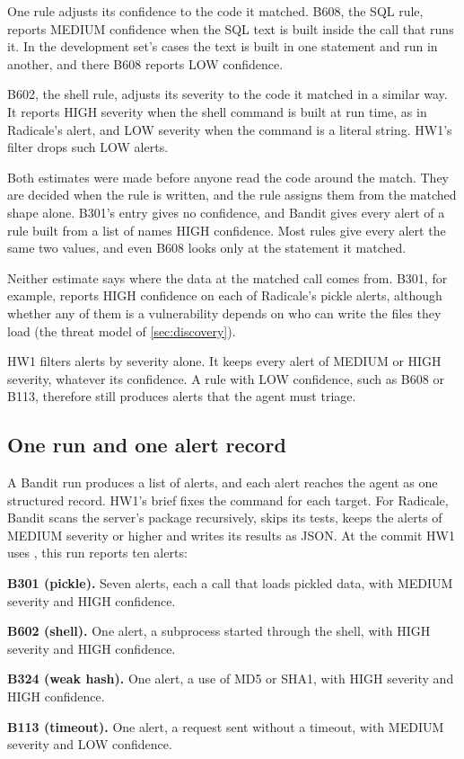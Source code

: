 One rule adjusts its confidence to the code it matched. B608, the SQL rule, reports MEDIUM
confidence when the SQL text is built inside the call that runs it. In the development set's cases
the text is built in one statement and run in another, and there B608 reports LOW confidence.

B602, the shell rule, adjusts its severity to the code it matched in a similar way. It reports HIGH
severity when the shell command is built at run time, as in Radicale's alert, and LOW severity when
the command is a literal string. HW1's filter drops such LOW alerts.

Both estimates were made before anyone read the code around the match. They are decided when the
rule is written, and the rule assigns them from the matched shape alone. B301's entry gives no
confidence, and Bandit gives every alert of a rule built from a list of names HIGH confidence. Most
rules give every alert the same two values, and even B608 looks only at the statement it matched.

Neither estimate says where the data at the matched call comes from. B301, for example, reports HIGH
confidence on each of Radicale's pickle alerts, although whether any of them is a vulnerability
depends on who can write the files they load (the threat model of \cref{sec:discovery}).

HW1 filters alerts by severity alone. It keeps every alert of MEDIUM or HIGH severity, whatever its
confidence. A rule with LOW confidence, such as B608 or B113, therefore still produces alerts that
the agent must triage.

\subsection{One run and one alert record}
\label{sec:triage-record}

A Bandit run produces a list of alerts, and each alert reaches the agent as one structured record.
HW1's brief fixes the command for each target. For Radicale, Bandit scans the server's package
recursively, skips its tests, keeps the alerts of MEDIUM severity or higher and writes its results as
JSON. At the commit HW1 uses \citep{radicale}, this run reports ten alerts:
\bi
\item \textbf{B301 (pickle).} Seven alerts, each a call that loads pickled data, with MEDIUM
severity and HIGH confidence.
\item \textbf{B602 (shell).} One alert, a subprocess started through the shell, with HIGH severity
and HIGH confidence.
\item \textbf{B324 (weak hash).} One alert, a use of MD5 or SHA1, with HIGH severity and HIGH
confidence.
\item \textbf{B113 (timeout).} One alert, a request sent without a timeout, with MEDIUM severity and
LOW confidence.
\ei

